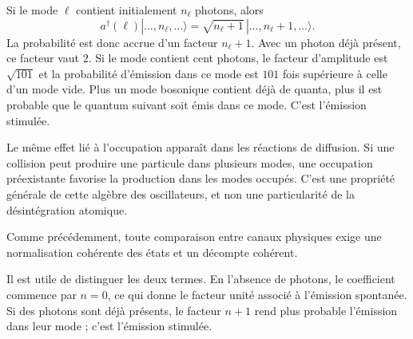 Si le mode \(\ell\) contient initialement \(n_\ell\) photons, alors
\begin{equation}
a^\dagger(\ell)
|\ldots,n_\ell,\ldots\rangle
=
\sqrt{n_\ell+1}
\,|\ldots,n_\ell+1,\ldots\rangle.
\end{equation}
La probabilité est donc accrue d’un facteur \(n_\ell+1\). Avec un photon déjà présent, ce facteur vaut \(2\). Si le mode contient cent photons, le facteur d’amplitude est \(\sqrt{101}\) et la probabilité d’émission dans ce mode est \(101\) fois supérieure à celle d’un mode vide. Plus un mode bosonique contient déjà de quanta, plus il est probable que le quantum suivant soit émis dans ce mode. C’est l’émission stimulée.

Le même effet lié à l’occupation apparaît dans les réactions de diffusion. Si une collision peut produire une particule dans plusieurs modes, une occupation préexistante favorise la production dans les modes occupés. C’est une propriété générale de cette algèbre des oscillateurs, et non une particularité de la désintégration atomique.

\begin{classroomqa}
\end{classroomqa}

Comme précédemment, toute comparaison entre canaux physiques exige une normalisation cohérente des états et un décompte cohérent.

\begin{classroomqa}
\end{classroomqa}

Il est utile de distinguer les deux termes. En l’absence de photons, le coefficient commence par \(n=0\), ce qui donne le facteur unité associé à l’émission spontanée. Si des photons sont déjà présents, le facteur \(n+1\) rend plus probable l’émission dans leur mode ; c’est l’émission stimulée.


